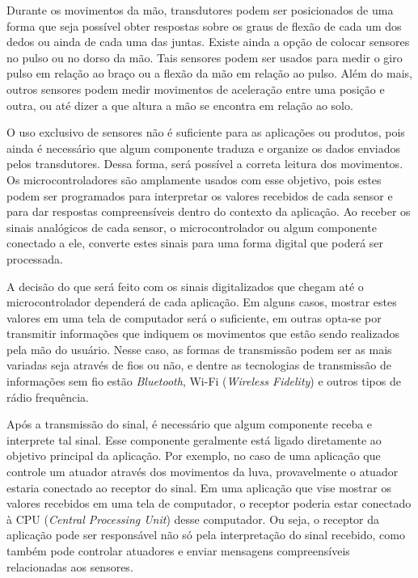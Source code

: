 \documentclass[
	12pt,				%
	openright,			%
	oneside,			%
	a4paper,			%
	english,			%
	brazil				%
	]{abntex2}
\begin{document}
		Durante os movimentos da mão, transdutores podem ser posicionados de uma forma que seja possível obter respostas sobre os graus de flexão de cada um dos dedos ou ainda de cada uma das juntas. Existe ainda a opção de colocar sensores no pulso ou no dorso da mão. Tais sensores podem ser usados para medir o giro pulso em relação ao braço ou a flexão da mão em relação ao pulso. Além do mais, outros sensores podem medir movimentos de aceleração entre uma posição e outra, ou até dizer a que altura a mão se encontra em relação ao solo.
		
		O uso exclusivo de sensores não é suficiente para as aplicações ou produtos, pois ainda é necessário que algum componente traduza e organize os dados enviados pelos transdutores. Dessa forma, será possível a correta leitura dos movimentos. Os microcontroladores são amplamente usados com esse objetivo, pois estes podem ser programados para interpretar os valores recebidos de cada sensor e para dar respostas compreensíveis dentro do contexto da aplicação. Ao receber os sinais analógicos de cada sensor, o microcontrolador ou algum componente conectado a ele, converte estes sinais para uma forma digital que poderá ser processada. 
	
		A decisão do que será feito com os sinais digitalizados que chegam até o microcontrolador dependerá de cada aplicação. Em alguns casos, mostrar estes valores em uma tela de computador será o suficiente, em outras opta-se por transmitir informações que indiquem os movimentos que estão sendo realizados pela mão do usuário. Nesse caso, as formas de transmissão podem ser as mais variadas seja através de fios ou não, e dentre as tecnologias de transmissão de informações sem fio estão \textit{Bluetooth}, Wi-Fi (\textit{Wireless Fidelity}) e outros tipos de rádio frequência.

		Após a transmissão do sinal, é necessário que algum componente receba e interprete tal sinal. Esse componente geralmente está ligado diretamente ao objetivo principal da aplicação. Por exemplo, no caso de uma aplicação que controle um atuador através dos movimentos da luva, provavelmente o atuador estaria conectado ao receptor do sinal. Em uma aplicação que vise mostrar os valores recebidos em uma tela de computador, o receptor poderia estar conectado à CPU (\textit{Central Processing Unit}) desse computador. Ou seja, o receptor da aplicação pode ser responsável não só pela interpretação do sinal recebido, como também pode controlar atuadores e enviar mensagens compreensíveis relacionadas aos sensores.
\end{document}
